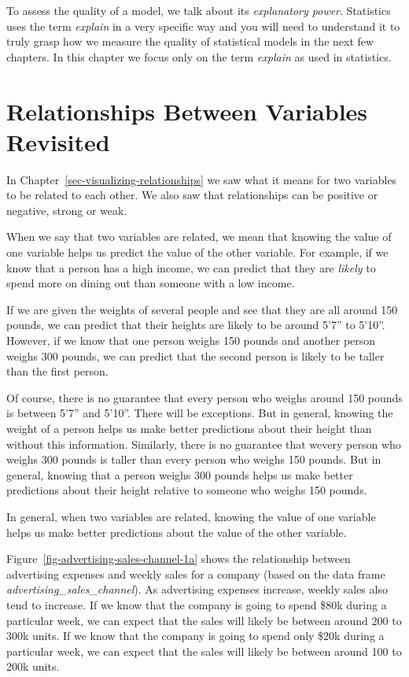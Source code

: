 \documentclass[
  12pt,
  letterpaper,
  DIV=11,
  numbers=noendperiod]{scrreprt}
\begin{document}
To assess the quality of a model, we talk about its \emph{explanatory
power}. Statistics uses the term \emph{explain} in a very specific way
and you will need to understand it to truly grasp how we measure the
quality of statistical models in the next few chapters. In this chapter
we focus only on the term \emph{explain} as used in statistics.

\section{Relationships Between Variables
Revisited}\label{relationships-between-variables-revisited}

In Chapter~\ref{sec-visualizing-relationships} we saw what it means for
two variables to be related to each other. We also saw that
relationships can be positive or negative, strong or weak.

When we say that two variables are related, we mean that knowing the
value of one variable helps us predict the value of the other variable.
For example, if we know that a person has a high income, we can predict
that they are \emph{likely} to spend more on dining out than someone
with a low income.

If we are given the weights of several people and see that they are all
around 150 pounds, we can predict that their heights are likely to be
around 5'7'' to 5'10''. However, if we know that one person weighs 150
pounds and another person weighs 300 pounds, we can predict that the
second person is likely to be taller than the first person.

Of course, there is no guarantee that every person who weighs around 150
pounds is between 5'7'' and 5'10''. There will be exceptions. But in
general, knowing the weight of a person helps us make better predictions
about their height than without this information. Similarly, there is no
guarantee that wevery person who weighs 300 pounds is taller than every
person who weighs 150 pounds. But in general, knowing that a person
weighs 300 pounds helps us make better predictions about their height
relative to someone who weighs 150 pounds.

In general, when two variables are related, knowing the value of one
variable helps us make better predictions about the value of the other
variable.

Figure~\ref{fig-advertising-sales-channel-1a} shows the relationship
between advertising expenses and weekly sales for a company (based on
the data frame \emph{advertising\_sales\_channel}). As advertising
expenses increase, weekly sales also tend to increase. If we know that
the company is going to spend \$80k during a particular week, we can
expect that the sales will likely be between around 200 to 300k units.
If we know that the company is going to spend only \$20k during a
particular week, we can expect that the sales will likely be between
around 100 to 200k units.
\end{document}
